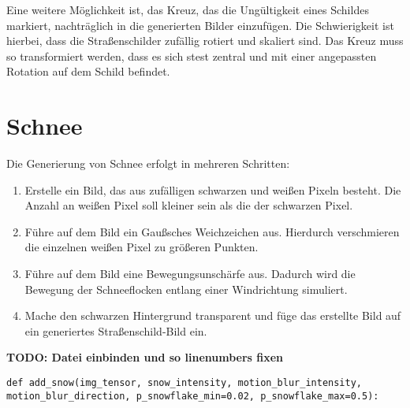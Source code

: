 Eine weitere Möglichkeit ist, das Kreuz, das die Ungültigkeit eines Schildes markiert, nachträglich in die generierten Bilder einzufügen. Die Schwierigkeit ist hierbei, dass die Straßenschilder zufällig rotiert und skaliert sind. Das Kreuz muss so transformiert werden, dass es sich stest zentral und mit einer angepassten Rotation auf dem Schild befindet.

\section{Schnee}
Die Generierung von Schnee erfolgt in mehreren Schritten:
\begin{enumerate}
  \item Erstelle ein Bild, das aus zufälligen schwarzen und weißen Pixeln besteht. Die Anzahl an weißen Pixel soll kleiner sein als die der schwarzen Pixel.
  \item Führe auf dem Bild ein Gaußsches Weichzeichen aus. Hierdurch verschmieren die einzelnen weißen Pixel zu größeren Punkten.
  \item Führe auf dem Bild eine Bewegungsunschärfe aus. Dadurch wird die Bewegung der Schneeflocken entlang einer Windrichtung simuliert.
  \item Mache den schwarzen Hintergrund transparent und füge das erstellte Bild auf ein generiertes Straßenschild-Bild ein.
\end{enumerate}

\textbf{TODO: Datei einbinden und so linenumbers fixen}
\begin{code}
\label{code:snow-delcaration}
\begin{verbatim}
def add_snow(img_tensor, snow_intensity, motion_blur_intensity, motion_blur_direction, p_snowflake_min=0.02, p_snowflake_max=0.5):
\end{verbatim}
\end{code}
